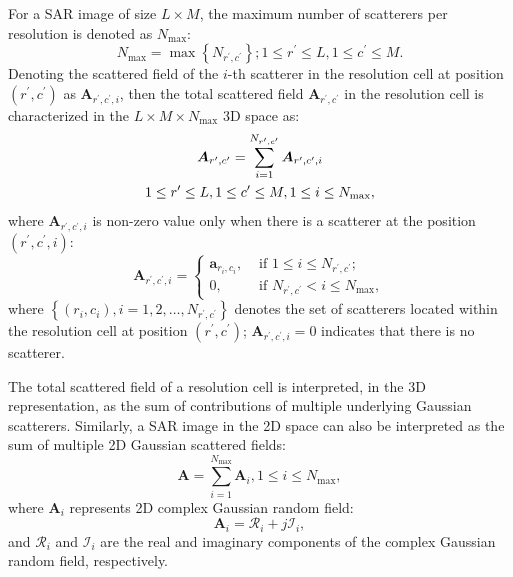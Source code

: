 \documentclass[journal]{IEEEtran}
\begin{document}
For a SAR image of size $L \times M$, the maximum number of scatterers per resolution is denoted as $N_{\max}$:
\begin{equation}
N_{\max }=\max \left\{N_{r^{\prime}, c^{\prime}}\right\} ; 1 \leq r^{\prime} \leq L, 1 \leq c^{\prime} \leq M .
\label{eq5}
\end{equation}
Denoting the scattered field of the $i$-th scatterer in the resolution cell at position $(r^{\prime},c^{\prime})$ as $\boldsymbol{A}_{r^{\prime},c^{\prime},i}$, then the total scattered field $\boldsymbol{A}_{r^{\prime},c^{\prime}}$ in the resolution cell is characterized in the $L \times M \times N_{\max}$ 3D space as:
\begin{gather}
\boldsymbol{A}_{r^{\prime},c^{\prime}} =\sum_{i=1}^{N_{r^{\prime}, c^{\prime}}} \boldsymbol{A}_{r^{\prime}, c^{\prime}, i} \\
1 \leq r^{\prime} \leq L, 1 \leq c^{\prime} \leq M, 1 \leq i \leq N_{\max \notag},
\label{eq6}
\end{gather}
where $\boldsymbol{A}_{r^{\prime}, c^{\prime}, i}$ is non-zero value only when there is a scatterer at the position $(r^{\prime}, c^{\prime}, i)$:
\begin{equation}
\boldsymbol{A}_{r^{\prime}, c^{\prime}, i} = \begin{cases}
\boldsymbol{a}_{r_{i}, c_{i}}, & \text { if } 1 \leq i \leq N_{r^{\prime}, c^{\prime}}; \\
0, & \text { if } N_{r^{\prime}, c^{\prime}}<i \leq N_{\max },
\label{eq7}
\end{cases}
\end{equation}
where $\left\{\left(r_{i}, c_{i}\right), i=1,2, \dots, N_{r^{\prime}, c^{\prime}}\right\}$ denotes the set of scatterers located within the resolution cell at position $(r^{\prime}, c^{\prime})$; $\boldsymbol{A}_{r^{\prime}, c^{\prime}, i} = 0$ indicates that there is no scatterer.


The total scattered field of a resolution cell is interpreted, in the 3D representation, as the sum of contributions of multiple underlying Gaussian scatterers.
Similarly, a SAR image in the 2D space can also be interpreted as the sum of multiple 2D Gaussian scattered fields:
\begin{equation}
\boldsymbol{A} = \sum_{i=1}^{N_{\max }} \boldsymbol{A}_{i}, 1 \leq i \leq N_{\max },
\label{eq8}
\end{equation}
where $\boldsymbol{A}_{i}$ represents 2D complex Gaussian random field:
\begin{equation}
\boldsymbol{A}_{i} = \mathcal{R}_{i}+j \mathcal{I}_{i},
\label{eq9}
\end{equation}
and $\mathcal{R}_{i}$ and $\mathcal{I}_{i}$ are the real and imaginary components of the complex Gaussian random field, respectively.
\end{document}
